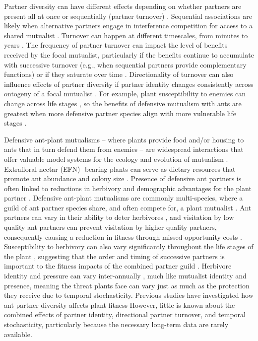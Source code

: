 \documentclass[11pt]{article}
\begin{document}
Partner diversity can have different effects depending on whether partners are present all at once or sequentially (partner turnover) \citep{Djieto-Lordon2005, Ness2006, Bruna2014,Barrett2015,Ushio2020,Dattilo2014}. 
Sequential associations are likely when alternative partners engage in interference competition for access to a shared mutualist \cite{Kiers2003,Batstone2018,Tgaard2015,Wulff2008}. 
Turnover can happen at different timescales, from minutes to years \citep{Oliveira1999,Horvitz1986}. 
The frequency of partner turnover can impact the level of benefits received by the focal mutualist, particularly if the benefits continue to accumulate with successive turnover (e.g., when sequential partners provide complementary functions) or if they saturate over time \citep{Sachs2004,Fiala1994}.
Directionality of turnover can also influence effects of partner diversity if partner identity changes consistently across ontogeny of a focal mutualist \citep{Fonseca2003,Noe1994,Dejean2008}.
For example, plant susceptibility to enemies can change across life stages \citep{Boege2005,Barton2010}, so the benefits of defensive mutualism with ants are greatest when more defensive partner species align with more vulnerable life stages \citep{Djieto-Lordon2005,Dejean2008}.

Defensive ant-plant mutualisms -- where plants provide food and/or housing to ants that in turn defend them from enemies -- are widespread interactions that offer valuable model systems for the ecology and evolution of mutualism \citep{Bronstein1998, Bronstein2006}. 
Extrafloral nectar (EFN) -bearing plants can serve as dietary resources that promote ant abundance and colony size \citep{Byk2011, Ness2009, Ness2006, Donald2022}.
Presence of defensive ant partners is often linked to reductions in herbivory  \citep{Trager2010, Rudgers2004} and demographic advantages for the plant partner \citep{Baez2016}.
Defensive ant-plant mutualisms are commonly multi-species, where a guild of ant partner species share, and often compete for, a plant mutualist \citep{Bronstein1998, Beattie1985, Trager2010, Agrawal1998}.
Ant partners can vary in their ability to deter herbivores \citep{Bruna2014}, and visitation by low quality ant partners can prevent visitation by higher quality partners, consequently causing a reduction in fitness through missed opportunity costs \citep{Fraser2001, Frederickson2005}.
Susceptibility to herbivory can also vary significantly throughout the life stages of the plant \citep{Boege2005}, suggesting that the order and timing of successive partners is important to the fitness impacts of the combined partner guild \citep{Barton2010, Boege2005, Fonseca2003}.
Herbivore identity and pressure can vary inter-annually \cite{Wetzel2023}, much like mutualist identity and presence, meaning the threat plants face can vary just as much as the protection they receive due to temporal stochasticity. 
Previous studies have investigated how ant partner diversity affects plant fitness \citep{Palmer2010,Afkhami2014,Fiala1994,Gaume1998,Dattilo2014,Ludka2015}
However, little is known about the combined effects of partner identity, directional partner turnover, and temporal stochasticity, particularly because the necessary long-term data are rarely available. 
	
\end{document}
